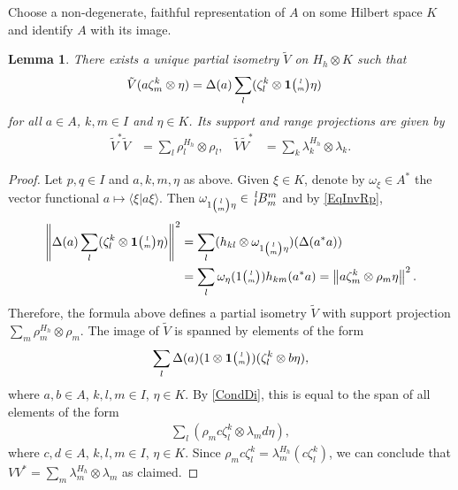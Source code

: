 \documentclass[11pt]{article}
\newcommand{\Grt}[3]{#1{\tiny {\begin{pmatrix} #2\\#3\end{pmatrix}}}}
\newcommand{\UnitC}[2]{\Grt{\mathbf{1}}{#1}{#2}}
\newcommand{\Grru}[2]{{\tiny \begin{pmatrix} #1 \\ #2\end{pmatrix}}}
\newcommand{\Gr}[5]{\,\tensor*[^{#2}_{#4}]{#1}{^{#3}_{#5}}}%
\newtheorem{Lem}[Theorem]{Lemma}
\theoremstyle{definition}
\numberwithin{equation}{section}
\begin{document}
 Choose a non-degenerate, faithful representation of $A$ on some Hilbert space $K$ and identify $A$
 with its image.
 \begin{Lem}\label{lem:reg-corep-pi}
   There exists a unique partial isometry $\tilde V$ on $H_{h} \otimes
   K$ such
   that
   \begin{align*}
     \tilde V(a \zeta^k_m \otimes \eta) &=
     \Delta(a) \sum_{l}(\zeta^{k}_{l} \otimes \UnitC{l}{m}\eta)
   \end{align*}
   for all $a\in A$, $k,m\in I$ and $\eta\in K$. Its support and range
   projections are given by
   \begin{align*}
     \tilde V^{*}\tilde V &= \sum_{l} \rho^{H_{h}}_{l} \otimes \rho_{l}, &
     \tilde V \tilde V^{*} &= \sum_{k} \lambda^{H_{h}}_{k} \otimes \lambda_{k}.
   \end{align*}
 \end{Lem}
 \begin{proof}
   Let $p,q\in I$ and $a,k,m,\eta$ as above. Given $\xi \in K$, denote by $\omega_{\xi}\in A^{*}$ the vector
   functional $a \mapsto \langle \xi|a\xi\rangle$.
   Then $\omega_{1\Grru{l}{m}\eta} \in \Gr{B}{l}{m}{l}{m}$ and by \eqref{EqInvRp},
   \begin{align*}
  \left\|\Delta(a)\sum_{l}(\zeta^{k}_{l}\otimes \UnitC{l}{m}\eta)\right\|^{2} &= \sum_{l} (h_{kl}
  \otimes \omega_{1\Grru{l}{m}\eta})(\Delta(a^{*}a)) \\
  &= \sum_{l}\omega_{\eta}(1\Grru{l}{m}) h_{km}(a^{*}a) 
  = \left\|a\zeta^{k}_{m} \otimes  \rho_{m}\eta \right\|^{2}.
\end{align*}
Therefore, the formula above defines a partial isometry $\tilde V$ with support projection $\sum_{m}
\rho^{H_{h}}_{m} \otimes \rho_{m}$. The image of $\tilde V$ is spanned by elements of the form
\begin{align*}
\sum_{l}   \Delta(a)(1 \otimes \UnitC{l}{m}) (\zeta^{k}_{l} \otimes b\eta),
\end{align*}
where $a,b\in A$, $k,l,m\in I$, $\eta\in K$. By  \eqref{CondDi}, this is equal to the span of all
elements of the form %
\begin{align*}
  \sum_{l} (\rho_{m}c \zeta^{k}_{l} \otimes \lambda_{m}d\eta),
\end{align*}%
where $c,d\in A$, $k,l,m \in I$, $\eta\in K$. Since $\rho_{m}c\zeta^{k}_{l} =
\lambda^{H_{h}}_{m}(c\zeta^{k}_{l})$, we can conclude that $VV^{*}=\sum_{m} \lambda^{H_{h}}_{m}
\otimes \lambda_{m}$ as claimed.
 \end{proof}
\end{document}

